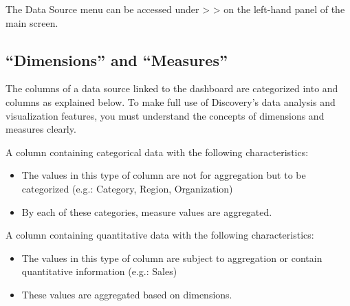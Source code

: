 \documentclass[letterpaper,10pt,english]{sphinxmanual}
\begin{document}
The Data Source menu can be accessed under  \textgreater{}  \textgreater{}  on the left-hand panel of the main screen.
\begin{quote}

\begin{figure}[H]
\centering

\noindent{}
\end{figure}
\end{quote}


\subsection{“Dimensions” and “Measures”}
\label{\detokenize{discovery/part02/dimension_and_measures:id1}}\label{\detokenize{discovery/part02/dimension_and_measures::doc}}
The columns of a data source linked to the dashboard are categorized into  and  columns as explained below. To make full use of Discovery’s data analysis and visualization features, you must understand the concepts of dimensions and measures clearly.
\begin{quote}

\begin{figure}[H]
\centering

\noindent{}
\end{figure}
\end{quote}


A column containing categorical data with the following characteristics:
\begin{itemize}
\item {} 
The values in this type of column are not for aggregation but to be categorized (e.g.: Category, Region, Organization)

\item {} 
By each of these categories, measure values are aggregated.

\end{itemize}


A column containing quantitative data with the following characteristics:
\begin{itemize}
\item {} 
The values in this type of column are subject to aggregation or contain quantitative information (e.g.: Sales)

\item {} 
These values are aggregated based on dimensions.

\end{itemize}
\end{document}
